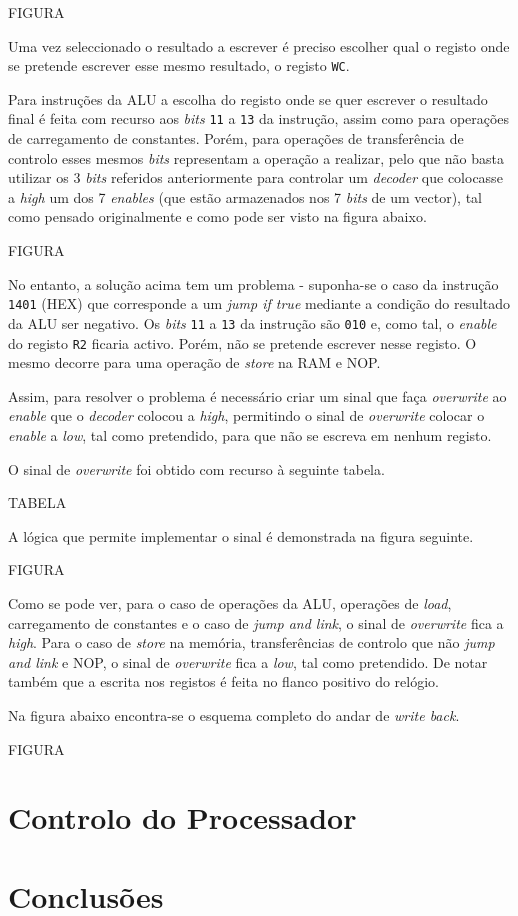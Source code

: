 \documentclass[11pt]{article}
\numberwithin{equation}{section}
\begin{document}
FIGURA

Uma vez seleccionado o resultado a escrever é preciso escolher qual o registo onde se pretende escrever esse mesmo resultado, o registo \texttt{WC}. 

Para instruções da ALU a escolha do registo onde se quer escrever o resultado final é feita com recurso aos \textit{bits} \texttt{11} a \texttt{13} da instrução, assim como para operações de carregamento de constantes. Porém, para operações de transferência de controlo esses mesmos \textit{bits} representam a operação a realizar, pelo que não basta utilizar os 3 \textit{bits} referidos anteriormente para controlar um \textit{decoder} que colocasse a \textit{high} um dos 7 \textit{enables} (que estão armazenados nos 7 \textit{bits} de um vector), tal como pensado originalmente e como pode ser visto na figura abaixo.

FIGURA

No entanto, a solução acima tem um problema - suponha-se o caso da instrução \texttt{1401} (HEX) que corresponde a um \textit{jump if true} mediante a condição do resultado da ALU ser negativo. Os \textit{bits} \texttt{11} a \texttt{13} da instrução são \texttt{010} e, como tal, o \textit{enable} do registo \texttt{R2} ficaria activo. Porém, não se pretende escrever nesse registo. O mesmo decorre para uma operação de \textit{store} na RAM e NOP. 

Assim, para resolver o problema é necessário criar um sinal que faça \textit{overwrite} ao \textit{enable} que o \textit{decoder} colocou a \textit{high}, permitindo o sinal de \textit{overwrite} colocar o \textit{enable} a \textit{low}, tal como pretendido, para que não se escreva em nenhum registo.

O sinal de \textit{overwrite} foi obtido com recurso à seguinte tabela.

TABELA

A lógica que permite implementar o sinal é demonstrada na figura seguinte.

FIGURA

Como se pode ver, para o caso de operações da ALU, operações de \textit{load}, carregamento de constantes e o caso de \textit{jump and link}, o sinal de \textit{overwrite} fica a \textit{high}. Para o caso de \textit{store} na memória, transferências de controlo que não \textit{jump and link} e NOP, o sinal de \textit{overwrite} fica a \textit{low}, tal como pretendido. De notar também que a escrita nos registos é feita no flanco positivo do relógio. 

Na figura abaixo encontra-se o esquema completo do andar de \textit{write back}.

FIGURA

\section{Controlo do Processador}


\section{Conclusões}

\pagebreak

\listoftodos
\end{document}
